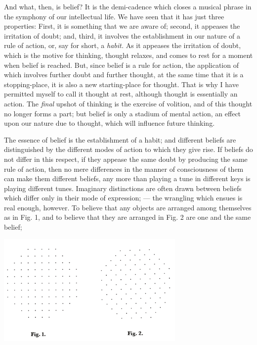 \documentclass[]{article}
\begin{document}
And what, then, is belief? It is the demi-cadence which closes a musical phrase in the symphony of our intellectual life. We have seen that it has just three properties: First, it is something that we are aware of; second, it appeases the irritation of doubt; and, third, it involves the establishment in our nature of a rule of action, or, say for short, a \emph{habit.} As it appeases the irritation of doubt, which is the motive for thinking, thought relaxes, and comes to rest for a moment when belief is reached. But, since belief is a rule for action, the application of which involves further doubt and further thought, at the same time that it is a stopping-place, it is also a new starting-place for thought. That is why I have permitted myself to call it thought at rest, although thought is essentially an action. The \emph{final} upshot of thinking is the exercise of volition, and of this thought no longer forms a part; but belief is only a stadium of mental action, an effect upon our nature due to thought, which will influence future thinking.
 

The essence of belief is the establishment of a habit; and different  beliefs are distinguished by the different modes of action to which they give rise. If beliefs do not differ in this respect, if they appease the same doubt by producing the same rule of action, then no mere differences in the manner of consciousness of them can make them different beliefs, any more than playing a tune in different keys is playing different tunes. Imaginary distinctions are often drawn between beliefs which differ only in their mode of expression; --- the wrangling which ensues is real enough, however. To believe that any objects are arranged among themselves as in Fig. 1, and to believe that they are arranged in Fig. 2 are one and the same belief;

\includegraphics[width=3.6in]{peirce-howto1.pdf}
\end{document}
